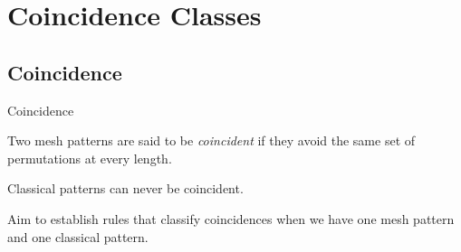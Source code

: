 \section{Coincidence Classes}
\label{sec:Coincidence Classes}
\subsection{Coincidence}
\label{sub:Coincidence}
\begin{frame}{Coincidence}
  \begin{definition}
    Two mesh patterns are said to be \emph{coincident} if they avoid the
    same set of permutations at every length.
  \end{definition}
  \begin{block}{}
    Classical patterns can never be coincident.

    Aim to establish rules that classify coincidences when we
    have one mesh pattern and one classical pattern.
  \end{block}
\end{frame}

